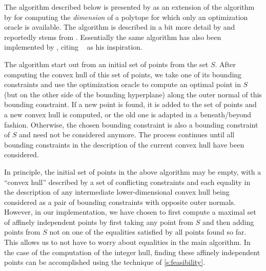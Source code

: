 The algorithm described below is presented by
 as an extension of the
algorithm by  for computing
the {\em dimension} of a polytope for which only an optimization oracle
is available.  The algorithm is described in a bit more detail
by  and reportedly stems from
.
Essentially the same algorithm has also been implemented
by , citing
~ as his inspiration.

The algorithm start out from an initial set of points from
the set $S$.  After computing the convex hull of this set
of points, we take one of its bounding constraints and use
the optimization oracle
to compute an optimal point in $S$ (but on the other side
of the bounding hyperplane) along the
outer normal of this bounding constraint.
If a new point is found, it is added to the set of points
and a new convex hull is computed, or the old one is adapted
in a beneath/beyond fashion.  Otherwise, the chosen bounding constraint
is also a bounding constraint of $S$ and need not be considered anymore.
The process continues until all bounding constraints in the
description of the current convex hull have been considered.

In principle, the initial set of points in the above algorithm
may be empty, with a ``convex hull'' described by a set of
conflicting constraints and each equality in the description of any
intermediate lower-dimensional convex hull being considered
as a pair of bounding constraints with opposite outer normals.
However, in our implementation, we have chosen to first compute
a maximal set of affinely independent points by first taking any
point from $S$ and then adding points from $S$ not on one of
the equalities satisfied by all points found so far.
This allows us to not have to worry about equalities in the
main algorithm.
In the case of the computation of the integer hull, finding
these affinely independent points can be accomplished using the technique of
\autoref{s:feasibility}.


